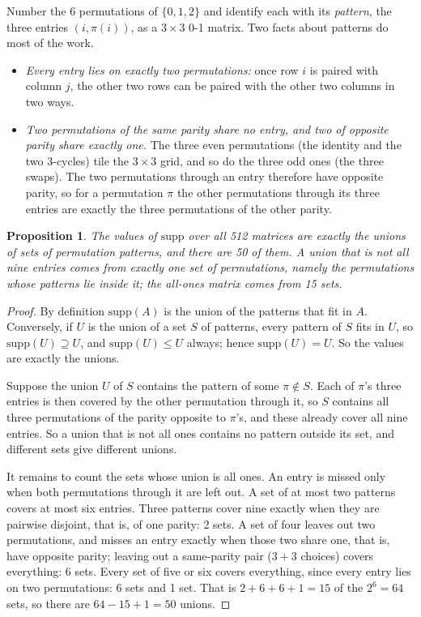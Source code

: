 \documentclass[11pt]{article}
\newtheorem{proposition}[theorem]{Proposition}
\theoremstyle{definition}
\theoremstyle{plain}
\begin{document}
Number the 6 permutations of $\{0,1,2\}$ and identify each with its \emph{pattern}, the three entries $(i,\pi(i))$, as a
$3\times 3$ 0-1 matrix. Two facts about patterns do most of the work.
\begin{itemize}
\item \emph{Every entry lies on exactly two permutations:} once row $i$ is paired with column $j$, the other two rows
  can be paired with the other two columns in two ways.
\item \emph{Two permutations of the same parity share no entry, and two of opposite parity share exactly one.} The
  three even permutations (the identity and the two 3-cycles) tile the $3\times 3$ grid, and so do the three odd ones
  (the three swaps). The two permutations through an entry therefore have opposite parity, so for a permutation $\pi$
  the other permutations through its three entries are exactly the three permutations of the other parity.
\end{itemize}

\begin{proposition}
\label{prop:fifty}
The values of $\mathrm{supp}$ over all 512 matrices are exactly the unions of sets of permutation patterns, and there
are 50 of them. A union that is not all nine entries comes from exactly one set of permutations, namely the
permutations whose patterns lie inside it; the all-ones matrix comes from 15 sets.
\end{proposition}
\begin{proof}
By definition $\mathrm{supp}(A)$ is the union of the patterns that fit in $A$. Conversely, if $U$ is the union of a
set $S$ of patterns, every pattern of $S$ fits in $U$, so $\mathrm{supp}(U)\supseteq U$, and $\mathrm{supp}(U)\le U$
always; hence $\mathrm{supp}(U)=U$. So the values are exactly the unions.

Suppose the union $U$ of $S$ contains the pattern of some $\pi\notin S$. Each of $\pi$'s three entries is then covered by
the other permutation through it, so $S$ contains all three permutations of the parity opposite to $\pi$'s, and these
already cover all nine entries. So a union that is not all ones contains no pattern outside its set, and different
sets give different unions.

It remains to count the sets whose union is all ones. An entry is missed only when both permutations through it are
left out. A set of at most two patterns covers at most six entries. Three patterns cover nine exactly when they are
pairwise disjoint, that is, of one parity: 2 sets. A set of four leaves out two permutations, and misses an entry
exactly when those two share one, that is, have opposite parity; leaving out a same-parity pair ($3+3$ choices) covers
everything: 6 sets. Every set of five or six covers everything, since every entry lies on two permutations: 6 sets and
1 set. That is $2+6+6+1=15$ of the $2^6=64$ sets, so there are $64-15+1=50$ unions.
\end{proof}
\end{document}
